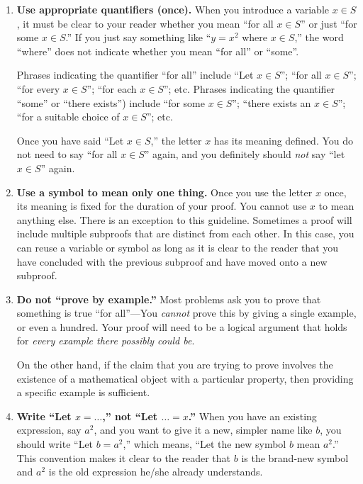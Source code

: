 \documentclass[11pt]{article}
\begin{document}
\begin{enumerate}
\item \textbf{Use appropriate quantifiers (once).}
When you introduce a variable $x\in S$, it must be clear to your reader whether you mean ``for all $x\in S$'' or just ``for some $x\in S$.'' If you just say something like ``$y=x^2$ where $x\in S$,'' the word ``where'' does not indicate whether you mean ``for all'' or ``some''.
        
Phrases indicating the quantifier ``for all'' include ``Let $x\in S$''; ``for all $x\in S$''; ``for every $x\in S$''; ``for each $x\in S$''; etc. Phrases indicating the quantifier ``some'' or ``there exists'') include ``for some $x\in S$''; ``there exists an $x\in S$''; ``for a suitable choice of $x\in S$''; etc.

Once you have said ``Let $x\in S$,'' the letter $x$ has its meaning defined. You do not need to say ``for all $x\in S$'' again, and you definitely should \emph{not} say ``let $x\in S$'' again.

\item \textbf{Use a symbol to mean only one thing.}
Once you use the letter $x$ once, its meaning is fixed for the duration of your proof. You cannot use $x$ to mean anything else. There is an exception to this guideline.  Sometimes a proof will include multiple subproofs that are distinct from each other.  In this case, you can reuse a variable or symbol as long as it is clear to the reader that you have concluded with the previous subproof and have moved onto a new subproof.   

\item \textbf{Do not ``prove by example.''}\label{pfbyexample}
Most problems ask you to prove that something is true ``for all''---You \emph{cannot} prove this by giving a single example, or even a hundred. Your proof will need to be a logical argument that holds for \emph{every example there possibly could be}.

On the other hand, if the claim that you are trying to prove involves the existence of a mathematical object with a particular property, then providing a specific example is sufficient.
        
\item \textbf{Write ``Let $x=\dots$,'' not ``Let $\dots=x$.''} 
When you have an existing expression, say $a^{2}$, and you want to give it a new, simpler name like $b$, you should write ``Let $b=a^{2}$,'' which means, ``Let the new symbol $b$ mean $a^{2}$.'' This convention makes it clear to the reader that $b$ is the brand-new symbol and $a^{2}$ is the old expression he/she already understands.
        

\end{enumerate}
\end{document}
